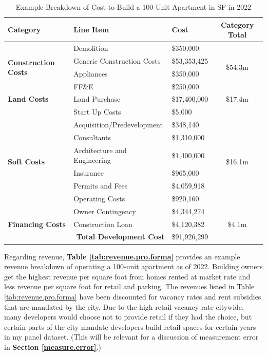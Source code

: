 \documentclass[a4paper,12pt]{article}
\begin{document}
\renewcommand{\arraystretch}{1.5}
\begin{table}[bht]
\centering
\caption{Example Breakdown of Cost to Build a 100-Unit Apartment in SF in 2022}
\label{tab:costs.pro.forma}
\begin{tabular}{|l|l|l|c|}
\hline
 \textbf{Category} & \textbf{Line Item} & \textbf{Cost} & \textbf{Category Total} \\
\hline
\multirow{4}{*}{\textbf{Construction Costs}} & Demolition & \$350,000 & \multirow{4}{*}{\$54.3m} \\
 & Generic Construction Costs & \$53,353,425& \\
 & Appliances & \$350,000 &\\
 & FF\&E & \$250,000 &\\
\hline
\multirow{1}{*}{\textbf{Land Costs}} & Land Purchase & \$17,400,000 & \$17.4m\\
\hline
\multirow{8}{*}{\textbf{Soft Costs}} & Start Up Costs & \$5,000 & \multirow{8}{*}{\$16.1m}  \\
 & Acquisition/Predevelopment & \$348,140 & \\
 & Consultants & \$1,310,000 &  \\
 & Architecture and Engineering & \$1,400,000 &\\
 & Insurance & \$965,000 &\\
 & Permits and Fees & \$4,059,918  &\\
 & Operating Costs & \$920,160 &\\
 & Owner Contingency & \$4,344,274 & \\
\hline
\multirow{1}{*}{\textbf{Financing Costs}} & Construction Loan & \$4,120,382 & \$4.1m\\
\hline
\multicolumn{2}{|r|}{\textbf{Total Development Cost}} & \$91,926,299 & \\
\hline
\end{tabular}
\end{table}




Regarding revenue, \textbf{Table \ref{tab:revenue.pro.forma}} provides an example revenue breakdown of operating a 100-unit apartment as of 2022. Building owners get the highest revenue per square foot from homes rented at market rate and less revenue per square foot for retail and parking. The revenues listed in Table \ref{tab:revenue.pro.forma} have been discounted for vacancy rates and rent subsidies that are mandated by the city. Due to the high retail vacancy rate citywide, many developers would choose not to provide retail if they had the choice, but certain parts of the city mandate developers build retail spaces for certain years in my panel dataset. (This will be relevant for a discussion of measurement error in \textbf{Section \ref{measure.error}}.)
\end{document}
